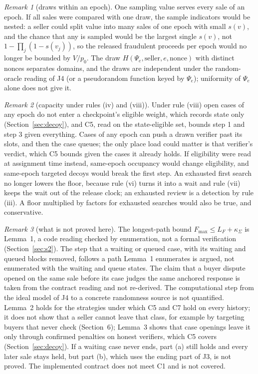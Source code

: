\documentclass[10pt,a4paper]{article}
\newcommand{\Fmax}{F_{\max}}
\newcommand{\kS}{\kappa_{\Sigma}}
\theoremstyle{plain}
\theoremstyle{remark}
\newtheorem{sremark}{Remark}
\begin{document}
\begin{sremark}[draws within an epoch]\label{rem:draws}
One sampling value serves every sale of an epoch. If all sales were compared with one draw, the sample indicators would be nested: a seller could split value into many sales of one epoch with small $s(v)$, and the chance that any is sampled would be the largest single $s(v)$, not $1-\prod_j(1-s(v_j))$, so the released fraudulent proceeds per epoch would no longer be bounded by $V/p_0$. The draw $H(\Psi_e,\text{seller},e,\text{nonce})$ with distinct nonces separates domains, and the draws are independent under the random-oracle reading of J4 (or a pseudorandom function keyed by $\Psi_e$); uniformity of $\Psi_e$ alone does not give it.
\end{sremark}

\begin{sremark}[capacity under rules (iv) and (viii)]\label{rem:capacity}
Under rule (viii) open cases of any epoch do not enter a checkpoint's eligible weight, which records state only (Section~\ref{sec:decoy}), and C5, read on the state-eligible set, bounds step 1 and step 3 given everything. Cases of any epoch can push a drawn verifier past its slots, and then the case queues; the only place load could matter is that verifier's verdict, which C5 bounds given the cases it already holds. If eligibility were read at assignment time instead, same-epoch occupancy would change eligibility, and same-epoch targeted decoys would break the first step. An exhausted first search no longer lowers the floor, because rule (vi) turns it into a wait and rule (vii) keeps the wait out of the release clock; an exhausted review is a detection by rule (iii). A floor multiplied by factors for exhausted searches would also be true, and conservative.
\end{sremark}


\begin{sremark}[what is not proved here]\label{rem:notproved}
The longest-path bound $\Fmax\le L_F+\kS$ is Lemma~1, a code reading checked by enumeration, not a formal verification (Section~\ref{sec:s2}). The step that a waiting or queued case, with its waiting and queued blocks removed, follows a path Lemma~1 enumerates is argued, not enumerated with the waiting and queue states. The claim that a buyer dispute opened on the same sale before its case judges the same anchored response is taken from the contract reading and not re-derived. The computational step from the ideal model of J4 to a concrete randomness source is not quantified. Lemma~2 holds for the strategies under which C5 and C7 hold on every history; it does not show that a seller cannot leave that class, for example by targeting buyers that never check (Section~6); Lemma~3 shows that case openings leave it only through confirmed penalties on honest verifiers, which C5 covers (Section~\ref{sec:decoy}). If a waiting case never ends, part (a) still holds and every later sale stays held, but part (b), which uses the ending part of J3, is not proved. The implemented contract does not meet C1 and is not covered.
\end{sremark}
\end{document}
